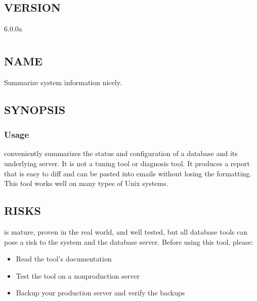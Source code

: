 \documentclass[letterpaper,10pt,english]{sphinxmanual}
\begin{document}
\section{VERSION}
\label{\detokenize{mariadb-status-diff:version}}
 6.0.0a


\chapter{}
\label{\detokenize{mariadb-summary:mariadb-summary}}\label{\detokenize{mariadb-summary::doc}}

\section{NAME}
\label{\detokenize{mariadb-summary:name}}
 \sphinxhyphen{} Summarize system information nicely.


\section{SYNOPSIS}
\label{\detokenize{mariadb-summary:synopsis}}

\subsection{Usage}
\label{\detokenize{mariadb-summary:usage}}
\begin{sphinxVerbatim}[commandchars=\\\{\}]
\end{sphinxVerbatim}

 conveniently summarizes the status and configuration of
a database and its underlying server. It is not a tuning tool or diagnosis tool.
It produces a report that is easy to diff and can be pasted into emails without
losing the formatting. This tool works well on many types of Unix systems.


\section{RISKS}
\label{\detokenize{mariadb-summary:risks}}
 is mature, proven in the real world, and well tested,
but all database tools can pose a risk to the system and the database
server.  Before using this tool, please:
\begin{itemize}
\item {} 
Read the tool’s documentation

\item {} 
Test the tool on a non\sphinxhyphen{}production server

\item {} 
Backup your production server and verify the backups

\end{itemize}
\end{document}
